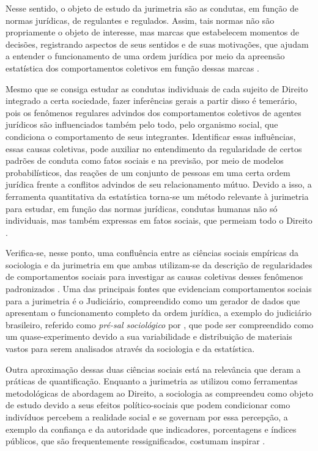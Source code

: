 Nesse sentido, o objeto de estudo da jurimetria são as condutas, em função de normas jurídicas, de regulantes e regulados. Assim, tais normas não são propriamente o objeto de interesse, mas marcas que estabelecem momentos de decisões, registrando aspectos de seus sentidos e de suas motivações, que ajudam a entender o funcionamento de uma ordem jurídica por meio da apreensão estatística dos comportamentos coletivos em função dessas marcas \cite{nunes2016jurimetria}.

Mesmo que se consiga estudar as condutas individuais de cada sujeito de Direito integrado a certa sociedade, fazer inferências gerais a partir disso é temerário, pois os fenômenos regulares advindos dos comportamentos coletivos de agentes jurídicos são influenciados também pelo todo, pelo organismo social, que condiciona o comportamento de seus integrantes. Identificar essas influências, essas causas coletivas, pode auxiliar no entendimento da regularidade de certos padrões de conduta como fatos sociais e na previsão, por meio de modelos probabilísticos, das reações de um conjunto de pessoas em uma certa ordem jurídica frente a conflitos advindos de seu relacionamento mútuo. Devido a isso, a ferramenta quantitativa da estatística torna-se um método relevante à jurimetria para estudar, em função das normas jurídicas, condutas humanas não só individuais, mas também expressas em fatos sociais, que permeiam todo o Direito \cite{nunes2016jurimetria} \cite{ehrlich1967fundamentos}.

Verifica-se, nesse ponto, uma confluência entre as ciências sociais empíricas da sociologia e da jurimetria em que ambas utilizam-se da descrição de regularidades de comportamentos sociais para investigar as causas coletivas desses fenômenos padronizados \cite{van2006facts}. Uma das principais fontes que evidenciam comportamentos sociais para a jurimetria é o Judiciário, compreendido como um gerador de dados que apresentam o funcionamento completo da ordem jurídica, a exemplo do judiciário brasileiro, referido como \emph{pré-sal sociológico} por , que pode ser compreendido como um quase-experimento devido a sua variabilidade e distribuição de materiais vastos para serem analisados através da sociologia e da estatística.

Outra aproximação dessas duas ciências sociais está na relevância que deram a práticas de quantificação. Enquanto a jurimetria as utilizou como ferramentas metodológicas de abordagem ao Direito, a sociologia as compreendeu como objeto de estudo devido a seus efeitos político-sociais que podem condicionar como indivíduos percebem a realidade social e se governam por essa percepção, a exemplo da confiança e da autoridade que indicadores, porcentagens e índices públicos, que são frequentemente ressignificados, costumam inspirar \cite{camargo2021estudos} \cite{daniel2013numeros}.

